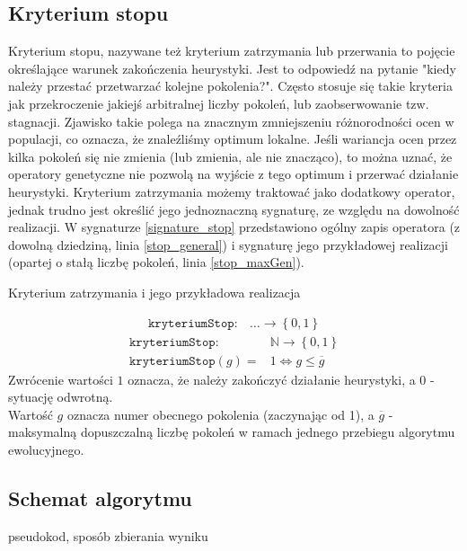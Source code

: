 \documentclass[twoside]{iisthesis}
\newcommand{\numberSet}{\mathbb}
\newcommand{\param}{\mathtt}
\begin{document}
\subsection{Kryterium stopu}

Kryterium stopu, nazywane też kryterium zatrzymania lub przerwania to pojęcie określające warunek zakończenia heurystyki. Jest to odpowiedź na pytanie "kiedy należy przestać przetwarzać kolejne pokolenia?". Często stosuje się takie kryteria jak przekroczenie jakiejś arbitralnej liczby pokoleń, lub zaobserwowanie tzw. stagnacji. Zjawisko takie polega na znacznym zmniejszeniu różnorodności ocen w populacji, co oznacza, że znaleźliśmy optimum lokalne. Jeśli wariancja ocen przez kilka pokoleń się nie zmienia (lub zmienia, ale nie znacząco), to można uznać, że operatory genetyczne nie pozwolą na wyjście z tego optimum i przerwać działanie heurystyki. 
Kryterium zatrzymania możemy traktować jako dodatkowy operator, jednak trudno jest określić jego jednoznaczną sygnaturę, ze względu na dowolność realizacji. W sygnaturze \ref{signature_stop} przedstawiono ogólny zapis operatora (z dowolną dziedziną, linia \ref{stop_general}) i sygnaturę jego przykładowej realizacji (opartej o stałą liczbę pokoleń, linia \ref{stop_maxGen}).

\begin{signature}
	\caption{Kryterium zatrzymania i jego przykładowa realizacja \label{signature_stop}} 
	\begin{align}
		\label{stop_general}
		\param{kryteriumStop}: &\ldots \rightarrow \left\{ 0, 1 \right\}
	\end{align}
	\begin{align}
		\label{stop_maxGen}
		\param{kryteriumStop}: &\numberSet{N} \rightarrow \left\{ 0, 1 \right\} \\
		\param{kryteriumStop}(g) = &1 \Leftrightarrow g \leq \overline{g}
	\end{align}
	Zwrócenie wartości $1$ oznacza, że należy zakończyć działanie heurystyki, a $0$ - sytuację odwrotną. \\ 
	Wartość $g$ oznacza numer obecnego pokolenia (zaczynając od 1), a $\overline{g}$ - maksymalną dopuszczalną liczbę pokoleń w ramach jednego przebiegu algorytmu ewolucyjnego.
\end{signature}	

\subsection{Schemat algorytmu}
pseudokod, sposób zbierania wyniku
\end{document}
